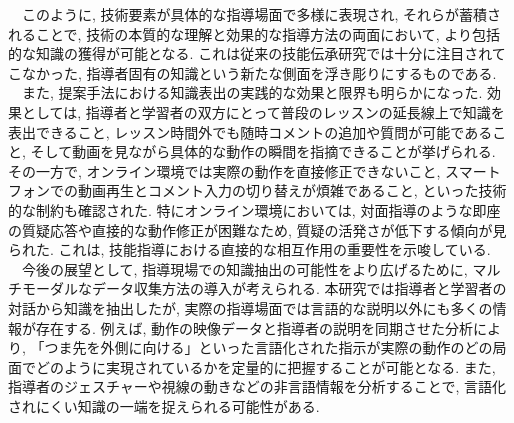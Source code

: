 　このように, 技術要素が具体的な指導場面で多様に表現され, それらが蓄積されることで, 技術の本質的な理解と効果的な指導方法の両面において, より包括的な知識の獲得が可能となる. これは従来の技能伝承研究では十分に注目されてこなかった, 指導者固有の知識という新たな側面を浮き彫りにするものである.\\
　また, 提案手法における知識表出の実践的な効果と限界も明らかになった. 効果としては, 指導者と学習者の双方にとって普段のレッスンの延長線上で知識を表出できること, レッスン時間外でも随時コメントの追加や質問が可能であること, そして動画を見ながら具体的な動作の瞬間を指摘できることが挙げられる. その一方で, オンライン環境では実際の動作を直接修正できないこと, スマートフォンでの動画再生とコメント入力の切り替えが煩雑であること, といった技術的な制約も確認された. 特にオンライン環境においては, 対面指導のような即座の質疑応答や直接的な動作修正が困難なため, 質疑の活発さが低下する傾向が見られた. これは, 技能指導における直接的な相互作用の重要性を示唆している.\\
　今後の展望として, 指導現場での知識抽出の可能性をより広げるために, マルチモーダルなデータ収集方法の導入が考えられる. 本研究では指導者と学習者の対話から知識を抽出したが, 実際の指導場面では言語的な説明以外にも多くの情報が存在する. 例えば, 動作の映像データと指導者の説明を同期させた分析により, 「つま先を外側に向ける」といった言語化された指示が実際の動作のどの局面でどのように実現されているかを定量的に把握することが可能となる. また, 指導者のジェスチャーや視線の動きなどの非言語情報を分析することで, 言語化されにくい知識の一端を捉えられる可能性がある.

